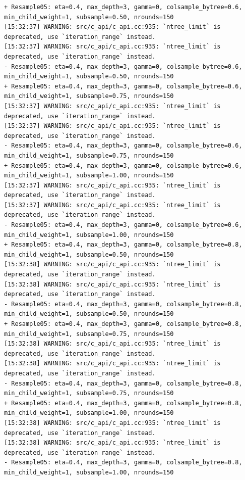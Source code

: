 \documentclass[
  letterpaper,
  DIV=11,
  numbers=noendperiod]{scrartcl}
\begin{document}
\begin{verbatim}
+ Resample05: eta=0.4, max_depth=3, gamma=0, colsample_bytree=0.6, min_child_weight=1, subsample=0.50, nrounds=150 
[15:32:37] WARNING: src/c_api/c_api.cc:935: `ntree_limit` is deprecated, use `iteration_range` instead.
[15:32:37] WARNING: src/c_api/c_api.cc:935: `ntree_limit` is deprecated, use `iteration_range` instead.
- Resample05: eta=0.4, max_depth=3, gamma=0, colsample_bytree=0.6, min_child_weight=1, subsample=0.50, nrounds=150 
+ Resample05: eta=0.4, max_depth=3, gamma=0, colsample_bytree=0.6, min_child_weight=1, subsample=0.75, nrounds=150 
[15:32:37] WARNING: src/c_api/c_api.cc:935: `ntree_limit` is deprecated, use `iteration_range` instead.
[15:32:37] WARNING: src/c_api/c_api.cc:935: `ntree_limit` is deprecated, use `iteration_range` instead.
- Resample05: eta=0.4, max_depth=3, gamma=0, colsample_bytree=0.6, min_child_weight=1, subsample=0.75, nrounds=150 
+ Resample05: eta=0.4, max_depth=3, gamma=0, colsample_bytree=0.6, min_child_weight=1, subsample=1.00, nrounds=150 
[15:32:37] WARNING: src/c_api/c_api.cc:935: `ntree_limit` is deprecated, use `iteration_range` instead.
[15:32:37] WARNING: src/c_api/c_api.cc:935: `ntree_limit` is deprecated, use `iteration_range` instead.
- Resample05: eta=0.4, max_depth=3, gamma=0, colsample_bytree=0.6, min_child_weight=1, subsample=1.00, nrounds=150 
+ Resample05: eta=0.4, max_depth=3, gamma=0, colsample_bytree=0.8, min_child_weight=1, subsample=0.50, nrounds=150 
[15:32:38] WARNING: src/c_api/c_api.cc:935: `ntree_limit` is deprecated, use `iteration_range` instead.
[15:32:38] WARNING: src/c_api/c_api.cc:935: `ntree_limit` is deprecated, use `iteration_range` instead.
- Resample05: eta=0.4, max_depth=3, gamma=0, colsample_bytree=0.8, min_child_weight=1, subsample=0.50, nrounds=150 
+ Resample05: eta=0.4, max_depth=3, gamma=0, colsample_bytree=0.8, min_child_weight=1, subsample=0.75, nrounds=150 
[15:32:38] WARNING: src/c_api/c_api.cc:935: `ntree_limit` is deprecated, use `iteration_range` instead.
[15:32:38] WARNING: src/c_api/c_api.cc:935: `ntree_limit` is deprecated, use `iteration_range` instead.
- Resample05: eta=0.4, max_depth=3, gamma=0, colsample_bytree=0.8, min_child_weight=1, subsample=0.75, nrounds=150 
+ Resample05: eta=0.4, max_depth=3, gamma=0, colsample_bytree=0.8, min_child_weight=1, subsample=1.00, nrounds=150 
[15:32:38] WARNING: src/c_api/c_api.cc:935: `ntree_limit` is deprecated, use `iteration_range` instead.
[15:32:38] WARNING: src/c_api/c_api.cc:935: `ntree_limit` is deprecated, use `iteration_range` instead.
- Resample05: eta=0.4, max_depth=3, gamma=0, colsample_bytree=0.8, min_child_weight=1, subsample=1.00, nrounds=150 

\end{verbatim}
\end{document}
